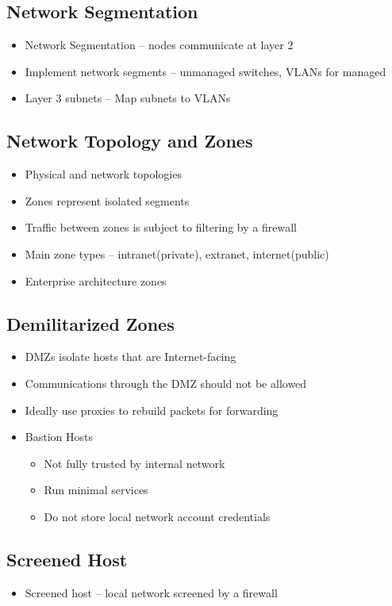 	\subsection {Network Segmentation}
		\begin{itemize}
			\item Network Segmentation -- nodes communicate at layer 2
			\item Implement network segments -- unmanaged switches, VLANs for managed
			\item Layer 3 subnets -- Map subnets to VLANs
		\end{itemize}
	\subsection {Network Topology and Zones}
		\begin{itemize}
			\item Physical and network topologies
			\item Zones represent isolated segments
			\item Traffic between zones is subject to filtering by a firewall
			\item Main zone types -- intranet(private), extranet, internet(public)
			\item Enterprise architecture zones
		\end{itemize}
	\subsection {Demilitarized Zones}
		\begin{itemize}
			\item DMZs isolate hosts that are Internet-facing
			\item Communications through the DMZ should not be allowed
			\item Ideally use proxies to rebuild packets for forwarding
			\item Bastion Hosts
				\begin{itemize}
					\item Not fully trusted by internal network
					\item Run minimal services
					\item Do not store local network account credentials
				\end{itemize}
		\end{itemize}
	\subsection {Screened Host}
		\begin{itemize}
			\item Screened host -- local network screened by a firewall
		\end{itemize}

